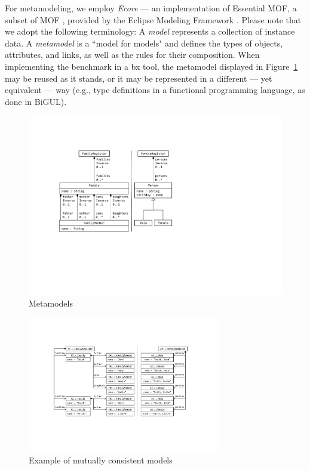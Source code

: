 For metamodeling, we employ \emph{Ecore} --- an implementation of Essential MOF, a subset of MOF \cite{MOF-2.5.1}, provided by the Eclipse Modeling Framework \cite{steinberg09}. Please note that we adopt the following terminology: A \emph{model} represents a collection of instance data. A \emph{metamodel} is a ``model for models" and defines the types of objects, attributes, and links, as well as the rules for their composition. When implementing the benchmark in a bx tool, the metamodel displayed in Figure~\ref{fig:metamodels} may be reused as it stands, or it may be represented in a different --- yet equivalent --- way (e.g., type definitions in a functional programming language, as done in BiGUL).

\begin{figure}[tb!]
	\centering
	\includegraphics[width=\columnwidth]{diagrams/Metamodels}
	\caption{Metamodels}
	\label{fig:metamodels}
\end{figure}

\begin{figure}[tb!]
	\centering
	\includegraphics[width=0.75\textwidth]{diagrams/Models}
	\caption{Example of mutually consistent models}
	\label{fig:models}
\end{figure}

